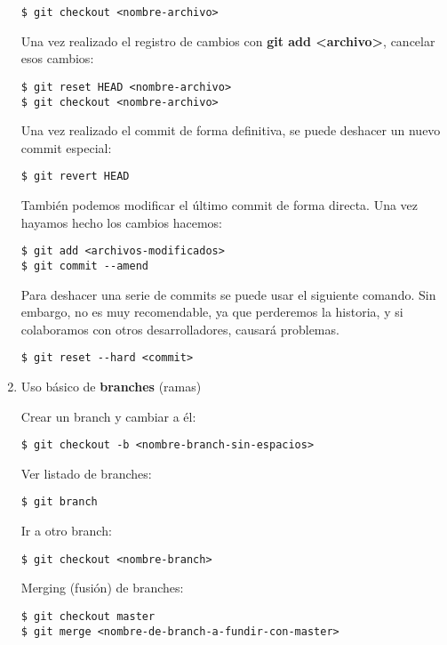 \documentclass[a4paper,oneside]{article}
\begin{document}
\begin{enumerate}
    \begin{verbatim}
$ git checkout <nombre-archivo>
    \end{verbatim}

Una vez realizado el registro de cambios con \textbf{git add <archivo>}, cancelar esos cambios:

    \begin{verbatim}
$ git reset HEAD <nombre-archivo>
$ git checkout <nombre-archivo>
    \end{verbatim}

Una vez realizado el commit de forma definitiva, se puede deshacer un nuevo commit especial:

    \begin{verbatim}
$ git revert HEAD
    \end{verbatim}

También podemos modificar el último commit de forma directa. Una vez hayamos hecho los cambios hacemos:

    \begin{verbatim}
$ git add <archivos-modificados>
$ git commit --amend
    \end{verbatim}

Para deshacer una serie de commits se puede usar el siguiente comando. Sin embargo, no es muy recomendable, ya que perderemos la historia, y si colaboramos con otros desarrolladores, causará problemas.

    \begin{verbatim}
$ git reset --hard <commit>
    \end{verbatim}


  \item Uso básico de \textbf{branches} (ramas)

Crear un branch y cambiar a él:

    \begin{verbatim}
$ git checkout -b <nombre-branch-sin-espacios>
    \end{verbatim}

Ver listado de branches:

    \begin{verbatim}
$ git branch
    \end{verbatim}

Ir a otro branch:

    \begin{verbatim}
$ git checkout <nombre-branch>
    \end{verbatim}

Merging (fusión) de branches:

    \begin{verbatim}
$ git checkout master
$ git merge <nombre-de-branch-a-fundir-con-master>
    \end{verbatim}

\end{enumerate}
\end{document}
